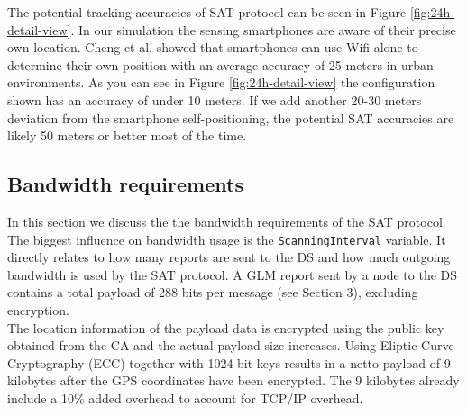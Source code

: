 \documentclass[10pt,titlepage]{article}
\begin{document}
The potential tracking accuracies of SAT protocol can be seen in Figure \ref{fig:24h-detail-view}. In our simulation the sensing smartphones are aware of their precise own location. Cheng et al. \cite{CHENG} showed that smartphones can use Wifi alone to determine their own position with an average accuracy of 25 meters in urban environments. As you can see in Figure \ref{fig:24h-detail-view} the configuration shown has an accuracy of under 10 meters. If we add another 20-30 meters deviation from
the smartphone self-positioning, the potential SAT accuracies are likely 50 meters or better most of the time.




\subsection{Bandwidth requirements}
In this section we discuss the the bandwidth requirements of the SAT protocol. The biggest influence on bandwidth usage is the \texttt{ScanningInterval} variable. It directly relates to how many reports are sent to the DS and how much outgoing bandwidth is used by the SAT protocol. A GLM report sent by a node to the DS contains a total payload of 288 bits per message (see Section 3), excluding encryption.\\

The location information of the payload data is encrypted using the public key obtained from the CA and the actual payload size increases. Using Eliptic Curve Cryptography (ECC) together with 1024 bit keys results in a netto payload of 9 kilobytes after the GPS coordinates have been encrypted. The 9 kilobytes already include a 10\% added overhead to account for TCP/IP overhead.
\end{document}
